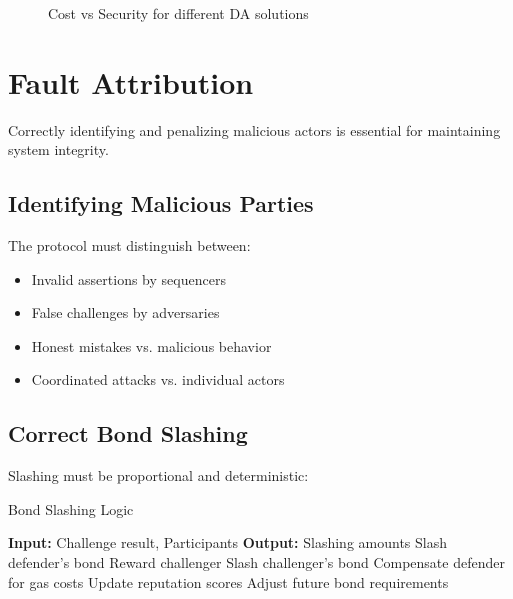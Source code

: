 \documentclass[11pt,a4paper]{article}
\theoremstyle{definition}
\begin{document}
\begin{figure}[h]
\centering
{}
\caption{Cost vs Security for different DA solutions}
\end{figure}

\section{Fault Attribution}

Correctly identifying and penalizing malicious actors is essential for maintaining system integrity.

\subsection{Identifying Malicious Parties}

The protocol must distinguish between:
\begin{itemize}
    \item Invalid assertions by sequencers
    \item False challenges by adversaries
    \item Honest mistakes vs. malicious behavior
    \item Coordinated attacks vs. individual actors
\end{itemize}

\subsection{Correct Bond Slashing}

Slashing must be proportional and deterministic:

\begin{algorithm}
\caption{Bond Slashing Logic}
\begin{algorithmic}[1]
\State \textbf{Input:} Challenge result, Participants
\State \textbf{Output:} Slashing amounts
    \State Slash defender's bond
    \State Reward challenger
    \State Slash challenger's bond
    \State Compensate defender for gas costs
\EndIf
\State Update reputation scores
\State Adjust future bond requirements
\end{algorithmic}
\end{algorithm}
\end{document}

